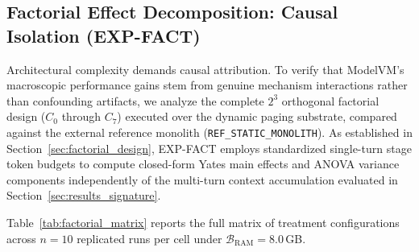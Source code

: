 \subsection{Factorial Effect Decomposition: Causal Isolation (EXP-FACT)}
\label{sec:results_factorial}

Architectural complexity demands causal attribution. To verify that ModelVM's macroscopic performance gains stem from genuine mechanism interactions rather than confounding artifacts, we analyze the complete $2^3$ orthogonal factorial design ($C_0$ through $C_7$) executed over the dynamic paging substrate, compared against the external reference monolith (\texttt{REF\_STATIC\_MONOLITH}). As established in Section~\ref{sec:factorial_design}, EXP-FACT employs standardized single-turn stage token budgets to compute closed-form Yates main effects and ANOVA variance components independently of the multi-turn context accumulation evaluated in Section~\ref{sec:results_signature}.

Table~\ref{tab:factorial_matrix} reports the full matrix of treatment configurations across $n=10$ replicated runs per cell under $\mathcal{B}_{\text{RAM}} = 8.0$\,GB.

